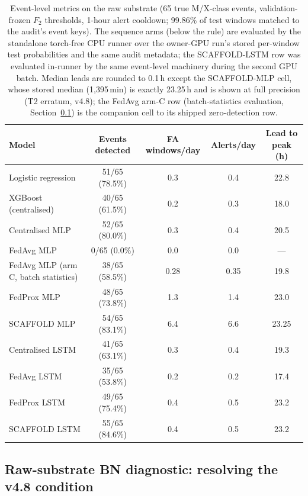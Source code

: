 \begin{table}[t]
\centering
\caption{Event-level metrics on the raw substrate (65 true M/X-class
events, validation-frozen $F_2$ thresholds, 1-hour alert cooldown;
99.86\% of test windows matched to the audit's event keys). The
sequence arms (below the rule) are evaluated by the standalone
torch-free CPU runner over the owner-GPU run's stored per-window
test probabilities and the same audit metadata; the SCAFFOLD-LSTM row
was evaluated in-runner by the same event-level machinery during
the second GPU batch. Median leads are rounded to 0.1\,h except the
SCAFFOLD-MLP cell, whose stored median (1{,}395\,min) is exactly
23.25\,h and is shown at full precision (T2 erratum, v4.8); the
FedAvg arm-C row (batch-statistics evaluation,
Section~\ref{sec:res-rawbn}) is the companion cell to its shipped
zero-detection row.}
\label{tab:eventlevel-raw}
\small
\begin{tabular}{@{}l c c c c@{}}
\toprule
\textbf{Model} & \textbf{Events detected} & \textbf{FA windows/day} &
\textbf{Alerts/day} & \textbf{Lead to peak (h)} \\
\midrule
Logistic regression & 51/65 (78.5\%) & 0.3 & 0.4 & 22.8 \\
XGBoost (centralised) & 40/65 (61.5\%) & 0.2 & 0.3 & 18.0 \\
Centralised MLP & 52/65 (80.0\%) & 0.3 & 0.4 & 20.5 \\
FedAvg MLP & 0/65 (0.0\%) & 0.0 & 0.0 & --- \\
FedAvg MLP (arm C, batch statistics) & 38/65 (58.5\%) & 0.28 & 0.35 & 19.8 \\
FedProx MLP & 48/65 (73.8\%) & 1.3 & 1.4 & 23.0 \\
SCAFFOLD MLP & 54/65 (83.1\%) & 6.4 & 6.6 & 23.25 \\
\midrule
Centralised LSTM & 41/65 (63.1\%) & 0.3 & 0.4 & 19.3 \\
FedAvg LSTM & 35/65 (53.8\%) & 0.2 & 0.2 & 17.4 \\
FedProx LSTM & 49/65 (75.4\%) & 0.4 & 0.5 & 23.2 \\
SCAFFOLD LSTM & 55/65 (84.6\%) & 0.4 & 0.5 & 23.2 \\
\bottomrule
\end{tabular}
\end{table}

\subsection{Raw-substrate BN diagnostic: resolving the v4.8 condition}
\label{sec:res-rawbn}

